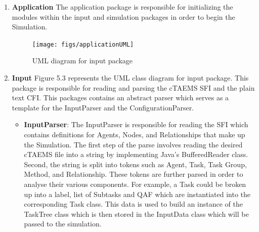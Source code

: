 \begin{enumerate}

\item \textbf{Application}  The application package is responsible for initializing the modules within the input and simulation packages in order to begin the Simulation.

\begin{figure}[H]
\centering
\texttt{[image: figs/applicationUML]}
\caption{UML diagram for input package}
\label{fig:input}
\end{figure}

\item \textbf{Input} Figure 5.3 represents the UML class diagram for input package. This package is responsible for reading and parsing the cTAEMS SFI and the plain text CFI. This packages contains an abstract parser which serves as a template for the InputParser and the ConfigurationParser. \\

\begin{itemize}
\item \textbf{InputParser}: The InputParser is responsible for reading the SFI which contains definitions for Agents, Nodes, and Relationships that make up the Simulation. The first step of the parse involves reading the desired cTAEMS file into a string by implementing Java's BufferedReader class. Second, the string is split into tokens such as Agent, Task, Task Group, Method, and Relationship. These tokens are further parsed in order to analyse their various components. For example, a Task could be broken up into a label, list of Subtasks and QAF which are instantiated into the corresponding Task class. This data is used to build an instance of the TaskTree class which is then stored in the InputData class which will be passed to the simulation. \\


\end{itemize}
\end{enumerate}
